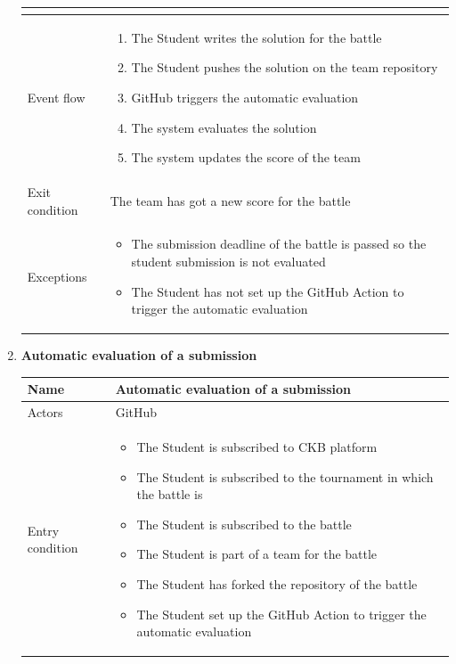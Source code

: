 \begin{enumerate}[label=UC\arabic*:]
\begin{tabular}{|p{3cm}|p{8cm}|}
\begin{itemize}
        \end{itemize} \\
        \hline
        Event flow &
        \begin{enumerate}[label=\arabic*.]
            \item The Student writes the solution for the battle
            \item The Student pushes the solution on the team repository
            \item GitHub triggers the automatic evaluation
            \item The system evaluates the solution
            \item The system updates the score of the team
        \end{enumerate} \\
        \hline
        Exit condition & The team has got a new score for the battle \\
        \hline
        Exceptions &
        \begin{itemize}
            \item The submission deadline of the battle is passed so the student submission is not evaluated
            \item The Student has not set up the GitHub Action to trigger the automatic evaluation
        \end{itemize} \\
        \hline
    \end{tabular}
    \item \textbf{Automatic evaluation of a submission} \\
    \begin{tabular}{|p{3cm}|p{8cm}|}
        \hline
        Name & Automatic evaluation of a submission \\
        \hline
        Actors & GitHub \\
        \hline
        Entry condition &
        \begin{itemize}
            \item The Student is subscribed to CKB platform
            \item The Student is subscribed to the tournament in which the battle is
            \item The Student is subscribed to the battle
            \item The Student is part of a team for the battle
            \item The Student has forked the repository of the battle
            \item The Student set up the GitHub Action to trigger the automatic evaluation

\end{itemize}
\end{tabular}
\end{enumerate}
